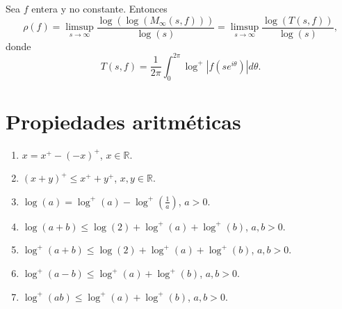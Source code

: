 \begin{proposition}
    Sea $f$ entera y no constante.
    Entonces
    $$\rho(f) = \limsup_{s \to \infty} \frac{\log(\log(M_\infty(s, f)))}{\log(s)} = \limsup_{s \to \infty} \frac{\log(T(s, f))}{\log(s)},$$
    donde
    $$T(s, f) = \frac{1}{2\pi} \int_0^{2\pi} \log^+|f(se^{i\theta})|d\theta.$$
\end{proposition}


\section{Propiedades aritméticas}
\begin{lemma}
    \hfill
    \begin{enumerate}
        \item $x = x^+ - (-x)^+$, $x \in \mathbb{R}$.
        \item $(x+y)^+ \leq x^+ + y^+$, $x, y \in \mathbb{R}$.
        \item $\log(a) = \log^+(a) - \log^+\left(\frac{1}{a}\right)$, $a > 0$.
        \item $\log(a+b) \leq \log(2) + \log^+(a) + \log^+(b)$, $a, b > 0$.
        \item $\log^+(a+b) \leq \log(2) + \log^+(a) + \log^+(b)$, $a, b > 0$.
        \item $\log^+(a-b) \leq \log^+(a) + \log^+(b)$, $a, b > 0$.
        \item $\log^+(ab) \leq \log^+(a) + \log^+(b)$, $a, b > 0$.
    \end{enumerate}
\end{lemma}

